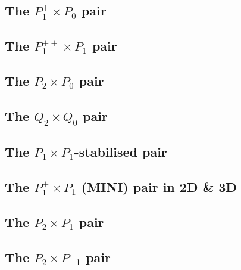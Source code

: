 \subsection{The ${ P}_1^+\times P_0$ pair} \label{ss:p1pp0}


\subsection{The ${ P}_1^{++}\times P_1$ pair} \label{ss:p1ppp1}


\subsection{The ${ P}_2\times P_0$ pair} \label{ss:p2p0}


\subsection{The $Q_2\times Q_0$ pair} \label{ss:pairq2q0}


\subsection{The ${ P}_1\times P_1$-stabilised pair} \label{ss:P1P1stab}


\subsection{The ${ P}_1^+\times P_1$ (MINI) pair in 2D \& 3D \label{pair:mini}}


\subsection{The ${ P}_2\times P_1$ pair \label{ss:p2p1}}


\subsection{The ${ P}_2\times P_{-1}$ pair \label{ss:p2pm1}}



